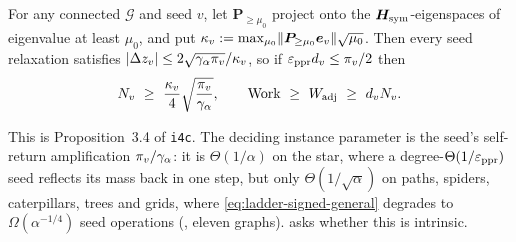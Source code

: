\begin{proposition}
\label{prop:ladder-signed-general}
For any connected $\mathcal{G}$ and seed $v$, let
$\bm{P}_{\ge\mu_{0}}$ project onto the
$\bm{H}_{\mathrm{sym}}$-eigenspaces of eigenvalue at least $\mu_{0}$, and put
$\kappa_{v}:=\max_{\mu_{0}}
\lVert\bm{P}_{\ge\mu_{0}}\bm{e}_{v}\rVert\sqrt{\mu_{0}}$.
Then every seed relaxation satisfies
$\left\lvert \Delta z_{v} \right\rvert\le2\sqrt{\gamma_{\alpha}\pi_{v}}/\kappa_{v}$, so if
$\varepsilon_{\mathrm{ppr}} d_{v}\le\pi_{v}/2$ then
\begin{equation}
    N_{v}\ \ge\ \frac{\kappa_{v}}{4}\sqrt{\frac{\pi_{v}}{\galpha}},
    \qquad
    \Work\ \ge\ W_{\mathrm{adj}}\ \ge\ d_{v}N_{v}.
    \label{eq:ladder-signed-general}
\end{equation}
\end{proposition}

\noindent
This is Proposition~3.4 of \texttt{i4c}. The deciding instance parameter is
the seed's self-return amplification $\pi_{v}/\gamma_{\alpha}$: it is
$\Theta(1/\alpha)$ on the star, where a degree-$\Theta(1/\varepsilon_{\mathrm{ppr}})$ seed
reflects its mass back in one step, but only $\Theta(1/\sqrt\alpha)$ on paths,
spiders, caterpillars, trees and grids, where \eqref{eq:ladder-signed-general}
degrades to $\Omega(\alpha^{-1/4})$ seed operations (\statusmeasured, eleven
graphs).  asks whether this is intrinsic.
